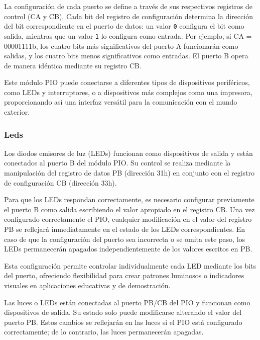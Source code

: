 \documentclass[12pt,oneside]{templates/unerthesis}
\begin{document}
La configuración de cada puerto se define a través de sus respectivos registros de control (CA y CB). Cada bit del registro de configuración determina la dirección del bit correspondiente en el puerto de datos: un valor \texttt{0} configura el bit como salida, mientras que un valor \texttt{1} lo configura como entrada. Por ejemplo, si CA = 00001111b, los cuatro bits más significativos del puerto A funcionarán como salidas, y los cuatro bits menos significativos como entradas. El puerto B opera de manera idéntica mediante su registro CB.

Este módulo PIO puede conectarse a diferentes tipos de dispositivos periféricos, como LEDs y interruptores, o a dispositivos más complejos como una impresora, proporcionando así una interfaz versátil para la comunicación con el mundo exterior.

\hypertarget{leds}{%
\subsubsection{Leds}\label{leds}}

Los diodos emisores de luz (LEDs) funcionan como dispositivos de salida y están conectados al puerto B del módulo PIO. Su control se realiza mediante la manipulación del registro de datos PB (dirección 31h) en conjunto con el registro de configuración CB (dirección 33h).

Para que los LEDs respondan correctamente, es necesario configurar previamente el puerto B como salida escribiendo el valor apropiado en el registro CB. Una vez configurado correctamente el PIO, cualquier modificación en el valor del registro PB se reflejará inmediatamente en el estado de los LEDs correspondientes. En caso de que la configuración del puerto sea incorrecta o se omita este paso, los LEDs permanecerán apagados independientemente de los valores escritos en PB.

Esta configuración permite controlar individualmente cada LED mediante los bits del puerto, ofreciendo flexibilidad para crear patrones luminosos o indicadores visuales en aplicaciones educativas y de demostración.

Las luces o LEDs están conectadas al puerto PB/CB del PIO y funcionan como dispositivos de salida. Su estado solo puede modificarse alterando el valor del puerto PB. Estos cambios se reflejarán en las luces si el PIO está configurado correctamente; de lo contrario, las luces permanecerán apagadas.
\end{document}
